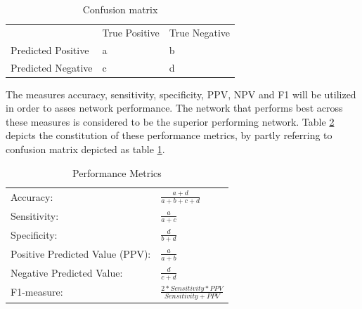 \documentclass[12pt]{article}
\begin{document}
\bigskip
\bgroup
\def\arraystretch{1.6}%
\begin{table}[h]
\centering
\caption{Confusion matrix}
\label{table:confusion}
\begin{tabular}{lll}
                                        & True Positive          & True Negative          \\ \cline{2-3} 
\multicolumn{1}{l|}{Predicted Positive} & \multicolumn{1}{l|}{a} & \multicolumn{1}{l|}{b} \\ \cline{2-3} 
\multicolumn{1}{l|}{Predicted Negative} & \multicolumn{1}{l|}{c} & \multicolumn{1}{l|}{d} \\ \cline{2-3} 
\end{tabular}
\end{table}
\egroup

The measures accuracy, sensitivity, specificity, PPV, NPV and F1 will be utilized in order to asses network performance. The network that performs best across these measures is considered to be the superior performing network. Table \ref{table:metrics} depicts the constitution of these performance metrics, by partly referring to confusion matrix depicted as table \ref{table:confusion}. 
\bigskip
\bgroup
\def\arraystretch{1.8}%
\begin{table}[h]
\centering
\caption{Performance Metrics}
\label{table:metrics}
\begin{tabular}{ll}
\hline
Accuracy:                       & \(\frac{\!\!\!\!\!\!\!\!\!\!\!\!\!\!a+d}{a+b+c+d}\) \\
Sensitivity:                    & \(\frac{a}{a+c}\)                                   \\
Specificity:                    & \(\frac{d}{b+d}\)                                   \\
Positive Predicted Value (PPV): & \(\frac{a}{a+b}\)                                   \\
Negative Predicted Value:       & \(\frac{d}{c+d}\)                                   \\
F1-measure:                     & \(\frac{2*Sensitivity*PPV}{Sensitivity+PPV}\)       \\ \hline
\end{tabular}
\end{table}
\egroup

\newpage



\end{document}
